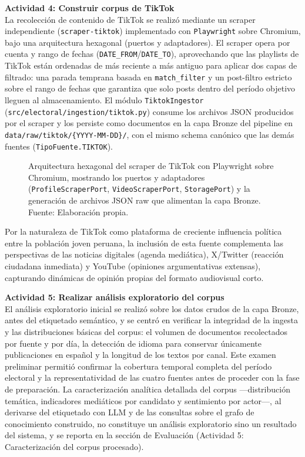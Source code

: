 \textbf{Actividad 4: Construir corpus de TikTok}
\\
La recolección de contenido de TikTok se realizó mediante un scraper independiente
(\texttt{scraper-tiktok}) implementado con \texttt{Playwright} sobre Chromium, bajo una
arquitectura hexagonal (puertos y adaptadores). El scraper opera por cuenta y rango de
fechas (\texttt{DATE\_FROM}/\texttt{DATE\_TO}), aprovechando que las playlists de TikTok
están ordenadas de más reciente a más antiguo para aplicar dos capas de filtrado: una
parada temprana basada en \texttt{match\_filter} y un post-filtro estricto sobre el
rango de fechas que garantiza que solo posts dentro del período objetivo lleguen al
almacenamiento. El módulo \texttt{TiktokIngestor}
(\texttt{src/electoral/ingestion/tiktok.py}) consume los archivos JSON producidos por
el scraper y los persiste como documentos en la capa Bronze del pipeline en
\texttt{data/raw/tiktok/\{YYYY-MM-DD\}/}, con el mismo schema canónico que las demás
fuentes (\texttt{TipoFuente.TIKTOK}).

\begin{figure}[!ht]
    \begin{center}
        \resizebox{0.85\textwidth}{!}{}
        \caption[Arquitectura hexagonal del scraper de TikTok con Playwright]{Arquitectura hexagonal del scraper de TikTok con Playwright sobre Chromium, mostrando los puertos y adaptadores (\texttt{ProfileScraperPort}, \texttt{VideoScraperPort}, \texttt{StoragePort}) y la generación de archivos JSON raw que alimentan la capa Bronze.\\
            Fuente: Elaboración propia.}
        \label{5:fig6b}
    \end{center}
\end{figure}

Por la naturaleza de TikTok como plataforma de creciente influencia política entre la
población joven peruana, la inclusión de esta fuente complementa las perspectivas de
las noticias digitales (agenda mediática), X/Twitter (reacción ciudadana inmediata) y
YouTube (opiniones argumentativas extensas), capturando dinámicas de opinión propias
del formato audiovisual corto.

\textbf{Actividad 5: Realizar análisis exploratorio del corpus}
\\
El análisis exploratorio inicial se realizó sobre los datos crudos de la capa
Bronze, antes del etiquetado semántico, y se centró en verificar la integridad
de la ingesta y las distribuciones básicas del corpus: el volumen de
documentos recolectados por fuente y por día, la detección de idioma para
conservar únicamente publicaciones en español y la longitud de los textos por
canal. Este examen preliminar permitió confirmar la cobertura temporal completa
del período electoral y la representatividad de las cuatro fuentes antes de
proceder con la fase de preparación. La caracterización analítica detallada del
corpus —distribución temática, indicadores mediáticos por candidato y
sentimiento por actor—, al derivarse del etiquetado con LLM y de las consultas
sobre el grafo de conocimiento construido, no constituye un análisis
exploratorio sino un resultado del sistema, y se reporta en la sección de
Evaluación (Actividad 5: Caracterización del corpus procesado).

